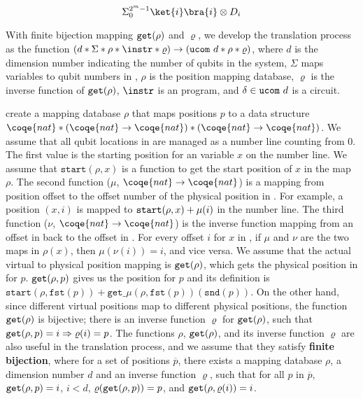 {{
\[\Sigma^{2^m-1}_{0}\ket{i}\bra{i}\otimes D_{i}\]
}

With finite bijection mapping $\texttt{get}(\rho)$ and $\varrho$, we develop the translation process as the function $(d * \Sigma * \rho * \instr * \varrho) \to (\tucom{d}* \rho * \varrho)$, where $d$ is the dimension number indicating the number of qubits in the system, $\Sigma$ maps variables to qubit numbers in \oqasm, $\rho$ is the position mapping database, $\varrho$ is the inverse function of $\texttt{get}(\rho)$, $\instr$ is an \oqasm program, and $\delta\in\texttt{ucom}~{d}$ is a \sqir circuit. 


create a mapping database $\rho$ that maps positions $p$ to a data structure $\coqe{nat} * (\coqe{nat} \to \coqe{nat}) * (\coqe{nat} \to \coqe{nat})$. We assume that all qubit locations in \sqir are managed as a number line counting from $0$. The first  value is the starting position for an \oqasm variable $x$ on the number line. We assume that $\texttt{start}(\rho,x)$ is a function to get the start position of $x$ in the map $\rho$. The second function ($\mu$, $\coqe{nat} \to \coqe{nat}$) is a mapping from position offset to the offset number of the physical position in \sqir. 
For example, a position $(x,i)$ is mapped to $\texttt{start}(\rho,x)+\mu(i)$ in the number line. The third function ($\nu$, $\coqe{nat} \to \coqe{nat}$) is the inverse function mapping from an offset in \sqir back to the offset in \oqasm. For every offset $i$ for $x$ in \oqasm, if $\mu$ and $\nu$ are the two maps in $\rho(x)$, then $\mu(\nu(i)) = i$, and vice versa. We assume that the actual virtual to physical position mapping is $ \texttt{get}(\rho)$, which gets the physical position in \sqir for $p$.
$\texttt{get}(\rho,p)$ gives us the \sqir position for $p$ and its definition is $\texttt{start}(\rho,\texttt{fst}(p))+\texttt{get\_}\mu(\rho,\texttt{fst}(p))(\texttt{snd}(p))$.
On the other hand, since different virtual positions map to different physical positions, the function $\texttt{get}(\rho)$ is bijective; there is an inverse function $\varrho$ for $\texttt{get}(\rho)$, such that $\texttt{get}(\rho,p)=i \Rightarrow \varrho(i) = p$. The functions $\rho$, $\texttt{get}(\rho)$, and its inverse function $\varrho$ are also useful in the translation process, and we assume that they satisfy \textbf{finite bijection}, where for a set of positions $\overline{p}$, there exists a mapping database $\rho$, a dimension number $d$ and an inverse function $\varrho$, such that for all $p$ in $\overline{p}$, $\texttt{get}(\rho,p)=i$, $i<d$, $\varrho(\texttt{get}(\rho,p))=p$, and $\texttt{get}(\rho,\varrho(i))=i$.}
